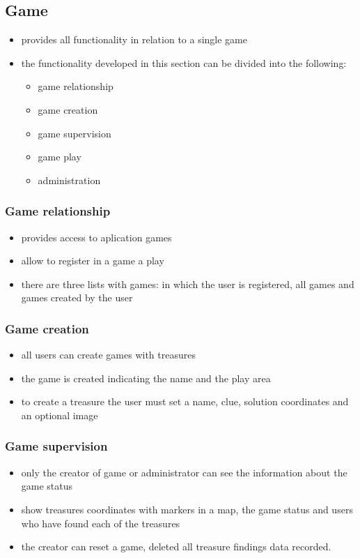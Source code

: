 \documentclass{article}
\begin{document}
\subsection{Game}
\begin{itemize}
\item provides all functionality in relation to a single game
\item the functionality developed in this section can be divided into the following:
\begin{itemize}
	\item game relationship
	\item game creation
	\item game supervision
	\item game play
	\item administration
\end{itemize}
\end{itemize}
\subsubsection{Game relationship}
\begin{itemize}
	\item provides access to aplication games
	\item allow to register in a game a play 
	\item there are three lists with games: in which the user is registered, all games and games created by the user
\end{itemize}
\subsubsection{Game creation}
\begin{itemize}
	\item all users can create games with treasures
	\item the game is created indicating the name and the play area
	\item to create a treasure the user must set a name, clue, solution coordinates and an optional image
\end{itemize}	
\subsubsection{Game supervision}
\begin{itemize}
	\item only the creator of game or administrator can see the information about the game status
	\item show treasures coordinates with markers in a map, the game status and users who have found each of the treasures
	\item the creator can reset a game, deleted all treasure findings data recorded.
\end{itemize}
\end{document}

